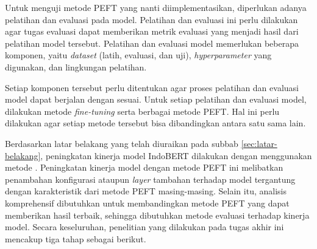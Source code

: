 Untuk menguji metode PEFT yang nanti  diimplementasikan, diperlukan adanya pelatihan dan evaluasi pada model. Pelatihan dan evaluasi ini perlu dilakukan agar tugas evaluasi dapat memberikan metrik evaluasi yang menjadi hasil dari pelatihan model tersebut. Pelatihan dan evaluasi model memerlukan beberapa komponen, yaitu \textit{dataset} (latih, evaluasi, dan uji), \textit{hyperparameter} yang digunakan, dan lingkungan pelatihan.

Setiap komponen tersebut perlu ditentukan agar proses pelatihan dan evaluasi model dapat berjalan dengan sesuai. Untuk setiap pelatihan dan evaluasi model, dilakukan metode \textit{fine-tuning} serta berbagai metode PEFT. Hal ini perlu dilakukan agar setiap metode tersebut bisa dibandingkan antara satu sama lain.

Berdasarkan latar belakang yang telah diuraikan pada subbab \ref{sec:latar-belakang}, peningkatan kinerja model IndoBERT dilakukan dengan menggunakan metode \PEFT. Peningkatan kinerja model dengan metode PEFT ini melibatkan penambahan konfigurasi ataupun \textit{layer} tambahan terhadap model tergantung dengan karakteristik dari metode PEFT masing-masing. Selain itu, analisis komprehensif dibutuhkan untuk membandingkan metode PEFT yang dapat memberikan hasil terbaik, sehingga dibutuhkan metode evaluasi terhadap kinerja model. Secara keseluruhan, penelitian yang dilakukan pada tugas akhir ini mencakup tiga tahap sebagai berikut.

